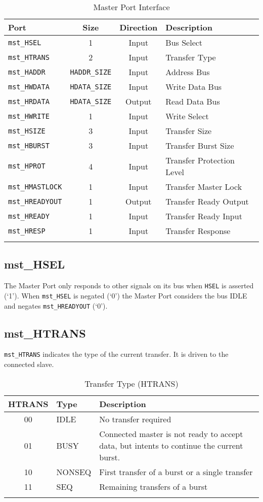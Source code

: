 \begin{longtable}[]{@{}lccl@{}}
\toprule
Port & Size & Direction & Description\tabularnewline
\midrule
\endhead
\texttt{mst\_HSEL}      & 1                     & Input  & Bus Select\tabularnewline
\texttt{mst\_HTRANS}    & 2                     & Input  & Transfer Type\tabularnewline
\texttt{mst\_HADDR}     & \texttt{HADDR\_SIZE}  & Input  & Address Bus\tabularnewline
\texttt{mst\_HWDATA}    & \texttt{HDATA\_SIZE}  & Input  & Write Data Bus\tabularnewline
\texttt{mst\_HRDATA}    & \texttt{HDATA\_SIZE}  & Output & Read Data Bus\tabularnewline
\texttt{mst\_HWRITE}    & 1                     & Input  & Write Select\tabularnewline
\texttt{mst\_HSIZE}     & 3                     & Input  & Transfer Size\tabularnewline
\texttt{mst\_HBURST}    & 3                     & Input  & Transfer Burst Size\tabularnewline
\texttt{mst\_HPROT}     & 4                     & Input  & Transfer Protection Level\tabularnewline
\texttt{mst\_HMASTLOCK} & 1                     & Input  & Transfer Master Lock\tabularnewline
\texttt{mst\_HREADYOUT} & 1                     & Output & Transfer Ready Output\tabularnewline
\texttt{mst\_HREADY}    & 1                     & Input  & Transfer Ready Input\tabularnewline
\texttt{mst\_HRESP}     & 1                     & Input  & Transfer Response\tabularnewline
\bottomrule
\caption{Master Port Interface}
\end{longtable}

\subsection{mst\_HSEL}\label{mst_hsel}

The Master Port only responds to other signals on its bus when \texttt{HSEL} is
asserted (`1'). When \texttt{mst\_HSEL} is negated (`0') the Master Port
considers the bus IDLE and negates \texttt{mst\_HREADYOUT} (`0').

\subsection{mst\_HTRANS}\label{mst_htrans}

\texttt{mst\_HTRANS} indicates the type of the current transfer. It is driven to
the connected slave.

\begin{longtable}[]{@{}clp{9cm}@{}}
\toprule
HTRANS & Type & Description\tabularnewline
\midrule
\endhead
00 & IDLE & No transfer required\tabularnewline
01 & BUSY & Connected master is not ready to accept data, but intents to
continue the current burst.\tabularnewline
10 & NONSEQ & First transfer of a burst or a single
transfer\tabularnewline
11 & SEQ & Remaining transfers of a burst\tabularnewline
\bottomrule
\caption{Transfer Type (HTRANS)}
\end{longtable}


